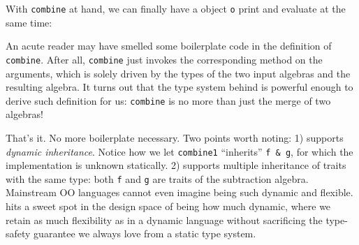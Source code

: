 With \lstinline{combine} at hand, we can finally have a object \lstinline{o}
print and evaluate at the same time:


An acute reader may have smelled some boilerplate code in the definition of
\lstinline{combine}. After all, \lstinline{combine} just invokes the
corresponding method on the arguments, which is solely driven by the types of
the two input algebras and the resulting algebra. It turns out that the type
system behind \name is powerful enough to derive such definition for us:
\lstinline{combine} is no more than just the merge of two algebras!


That's it. No more boilerplate necessary. Two points worth noting: 1) \name
supports \textit{dynamic inheritance}. Notice how we let \lstinline{combine1}
``inherits'' \lstinline{f & g}, for which the implementation is unknown
statically. 2) \name supports multiple inheritance of traits with the same type:
both \lstinline{f} and \lstinline{g} are traits of the subtraction algebra.
Mainstream OO languages cannot even imagine being such dynamic and flexible.
\name hits a sweet spot in the design space of being how much dynamic, where we
retain as much flexibility as in a dynamic language without sacrificing the
type-safety guarantee we always love from a static type system.
